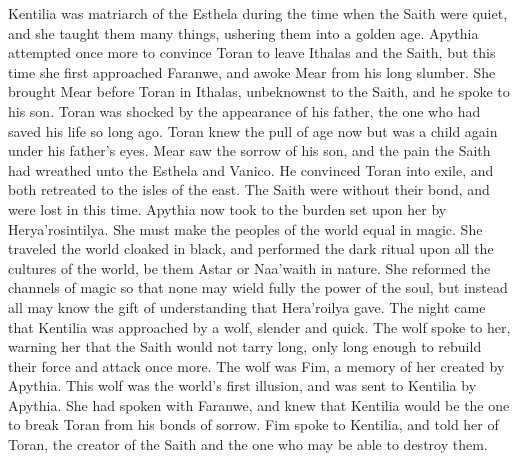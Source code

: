 \documentclass[smalldemyvopaper,11pt,twoside,onecolumn,openright,extrafontsizes]{memoir}
\begin{document}
{{Kentilia was matriarch of the Esthela during the time when the Saith were quiet, and she taught them many things, ushering them into a golden age.
Apythia attempted once more to convince Toran to leave Ithalas and the Saith, but this time she first approached Faranwe, and awoke Mear from his long slumber. She brought Mear before Toran in Ithalas, unbeknownst to the Saith, and he spoke to his son. Toran was shocked by the appearance of his father, the one who had saved his life so long ago. Toran knew the pull of age now but was a child again under his father’s eyes. Mear saw the sorrow of his son, and the pain the Saith had wreathed unto the Esthela and Vanico. He convinced Toran into exile, and both retreated to the isles of the east. The Saith were without their bond, and were lost in this time. Apythia now took to the burden set upon her by Herya’rosintilya. She must make the peoples of the world equal in magic. She traveled the world cloaked in black, and performed the dark ritual upon all the cultures of the world, be them Astar or Naa’waith in nature. She reformed the channels of magic so that none may wield fully the power of the soul, but instead all may know the gift of understanding that Hera’roilya gave. 
The night came that Kentilia was approached by a wolf, slender and quick. The wolf spoke to her, warning her that the Saith would not tarry long, only long enough to rebuild their force and attack once more. The wolf was Fim, a memory of her created by Apythia. This wolf was the world’s first illusion, and was sent to Kentilia by Apythia. She had spoken with Faranwe, and knew that Kentilia would be the one to break Toran from his bonds of sorrow. Fim spoke to Kentilia, and told her of Toran, the creator of the Saith and the one who may be able to destroy them.
}}
\end{document}
